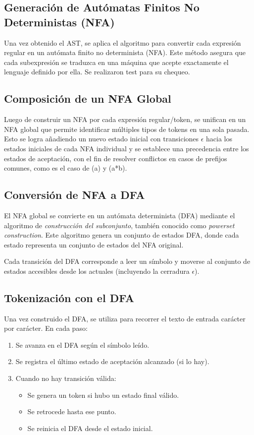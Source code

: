 \documentclass{article}
\begin{document}
\subsection{Generación de Autómatas Finitos No Deterministas (NFA)}

Una vez obtenido el AST, se aplica el algoritmo para convertir cada expresión regular en un autómata finito no determinista (NFA). Este método asegura que cada subexpresión se traduzca en una máquina que acepte exactamente el lenguaje definido por ella. Se realizaron test para su chequeo.

\subsection{Composición de un NFA Global}

Luego de construir un NFA por cada expresión regular/token, se unifican en un NFA global que permite identificar múltiples tipos de tokens en una sola pasada. Esto se logra añadiendo un nuevo estado inicial con transiciones $\epsilon$ hacia los estados iniciales de cada NFA individual y se establece una precedencia entre los estados de aceptación, con el fin de resolver conflictos en casos de prefijos comunes, como es el caso de (a) y (a*b).

\subsection{Conversión de NFA a DFA}

El NFA global se convierte en un autómata determinista (DFA) mediante el algoritmo de \textit{construcción del subconjunto}, también conocido como \textit{powerset construction}. Este algoritmo genera un conjunto de estados DFA, donde cada estado representa un conjunto de estados del NFA original.

Cada transición del DFA corresponde a leer un símbolo y moverse al conjunto de estados accesibles desde los actuales (incluyendo la cerradura $\epsilon$).

\subsection{Tokenización con el DFA}

Una vez construido el DFA, se utiliza para recorrer el texto de entrada carácter por carácter. En cada paso:
\begin{enumerate}
    \item Se avanza en el DFA según el símbolo leído.
    \item Se registra el último estado de aceptación alcanzado (si lo hay).
    \item Cuando no hay transición válida:
    \begin{itemize}
        \item Se genera un token si hubo un estado final válido.
        \item Se retrocede hasta ese punto.
        \item Se reinicia el DFA desde el estado inicial.
    \end{itemize}
\end{enumerate}
\end{document}

